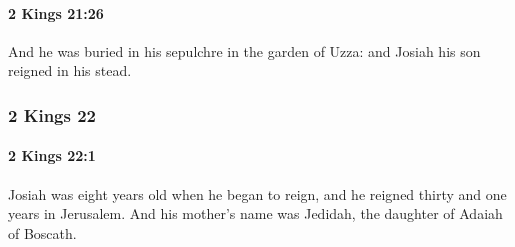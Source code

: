 		\paragraph{2 Kings 21:26} %
			\label{2KINGS-21-26}

			And he was buried in his sepulchre in the garden of Uzza: and Josiah his son reigned in his stead.

	\subsubsection{2 Kings 22} %
		\label{2KINGS-22}

		\paragraph{2 Kings 22:1} %
			\label{2KINGS-22-1}

			Josiah was eight years old when he began to reign, and he reigned thirty and one years in Jerusalem. And his mother’s name was Jedidah, the daughter of Adaiah of Boscath.

